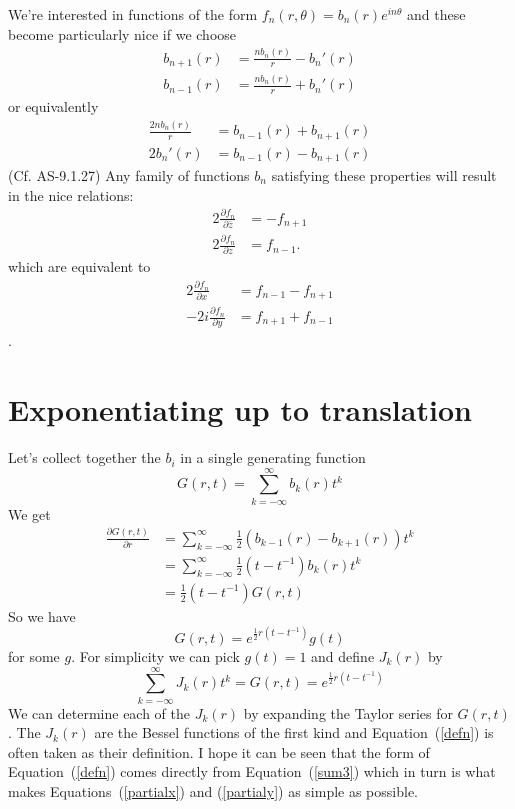 \documentclass{article}
\begin{document}
We're interested in functions of the form
$f_n(r,\theta)=b_n(r)e^{in\theta}$
and these become particularly nice if we choose
\begin{align*}
b_{n+1}(r) & = \frac{nb_n(r)}{r}-b_n'(r) \\
b_{n-1}(r) & = \frac{nb_n(r)}{r}+b_n'(r)
\end{align*}
or equivalently
\begin{align}
\frac{2nb_n(r)}{r} & =  b_{n-1}(r)+b_{n+1}(r) \label{sum} \\
2b_n'(r) & =  b_{n-1}(r)-b_{n+1}(r) \label{deriv}
\end{align}
(Cf. AS-9.1.27)
Any family of functions $b_n$ satisfying these properties will result in the nice relations:
\begin{align*}
2\frac{\partial f_n}{\partial\bar{z}} & = -f_{n+1} \\
2\frac{\partial f_n}{\partial z} & = f_{n-1}.
\end{align*}
which are equivalent to
\begin{align}
2\frac{\partial f_n}{\partial x} & = f_{n-1}-f_{n+1} \label{sum3} \\
-2i\frac{\partial f_n}{\partial y} & = f_{n+1}+f_{n-1} \label{sum4}
\end{align}.

\section{Exponentiating up to translation}
Let's collect together the $b_i$ in a single generating function
\[
G(r,t) = \sum_{k=-\infty}^\infty b_k(r)t^k
\]
We get
\begin{align*}
\frac{\partial G(r,t)}{\partial r} &= \sum_{k=-\infty}^\infty \frac{1}{2}(b_{k-1}(r)-b_{k+1}(r))t^k\\
&= \sum_{k=-\infty}^\infty \frac{1}{2}(t-t^{-1})b_k(r)t^k \\
&= \frac{1}{2}(t-t^{-1})G(r,t)
\end{align*}
So we have
\[
G(r,t) = e^{\frac{1}{2}r(t-t^{-1})}g(t)
\]
for some $g$.
For simplicity we can pick $g(t) = 1$ and define $J_k(r)$ by
\begin{equation}
\sum_{k=-\infty}^\infty J_k(r)t^k = G(r,t) = e^{\frac{1}{2}r(t-t^{-1})}\label{defn}
\end{equation}
We can determine each of the $J_k(r)$ by expanding the Taylor series for $G(r, t)$.
The $J_k(r)$ are the Bessel functions of the first kind and Equation~(\ref{defn}) is often taken as their definition.
I hope it can be seen that the form of Equation~(\ref{defn}) comes directly from Equation~(\ref{sum3}) which in turn is what makes Equations~(\ref{partialx}) and (\ref{partialy}) as simple as possible.
\end{document}
